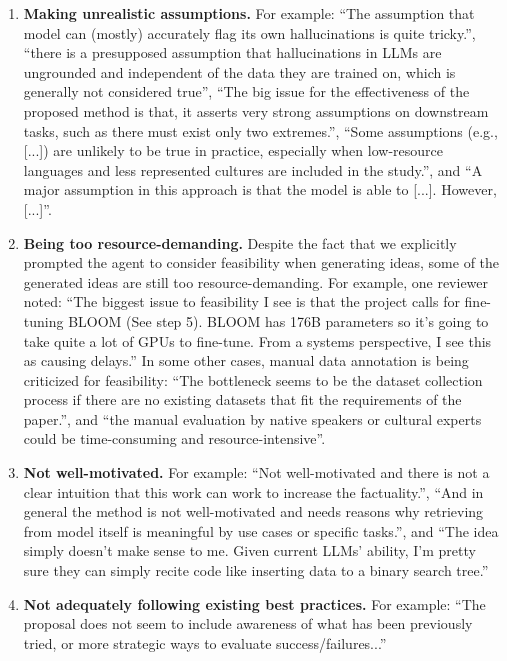 \begin{enumerate}
    \item \textbf{Making unrealistic assumptions.} For example: ``The assumption that model can (mostly) accurately flag its own hallucinations is quite tricky.'', ``there is a presupposed assumption that hallucinations in LLMs are ungrounded and independent of the data they are trained on, which is generally not considered true'', ``The big issue for the effectiveness of the proposed method is that, it asserts very strong assumptions on downstream tasks, such as there must exist only two extremes.'', ``Some assumptions (e.g., [...]) are unlikely to be true in practice, especially when low-resource languages and less represented cultures are included in the study.'', and ``A major assumption in this approach is that the model is able to [...]. However, [...]''. 

    \item \textbf{Being too resource-demanding.} Despite the fact that we explicitly prompted the agent to consider feasibility when generating ideas, some of the generated ideas are still too resource-demanding.  For example, one reviewer noted: ``The biggest issue to feasibility I see is that the project calls for fine-tuning BLOOM (See step 5). BLOOM has 176B parameters so it's going to take quite a lot of GPUs to fine-tune. From a systems perspective, I see this as causing delays.'' In some other cases, manual data annotation is being criticized for feasibility: ``The bottleneck seems to be the dataset collection process if there are no existing datasets that fit the requirements of the paper.'', and ``the manual evaluation by native speakers or cultural experts could be time-consuming and resource-intensive''. 

    \item \textbf{Not well-motivated.} For example: ``Not well-motivated and there is not a clear intuition that this work can work to increase the factuality.'', ``And in general the method is not well-motivated and needs reasons why retrieving from model itself is meaningful by use cases or specific tasks.'', and ``The idea simply doesn't make sense to me. Given current LLMs' ability, I'm pretty sure they can simply recite code like inserting data to a binary search tree.''

    \item \textbf{Not adequately following existing best practices.} For example: ``The proposal does not seem to include awareness of what has been previously tried, or more strategic ways to evaluate success/failures...''

\end{enumerate}


